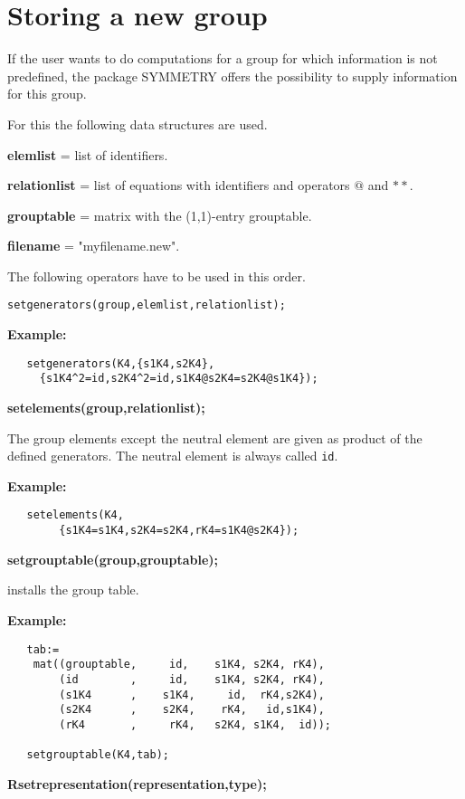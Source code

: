 \section{Storing a new group}

If the user wants to do computations for a group for which
information is not predefined,
the package SYMMETRY offers the possibility to supply information
for this group.

For this the following data structures are used.

{\bf elemlist} = list of identifiers.

{\bf relationlist}  = list of equations with identifiers and
operators $@$ and $**$.

{\bf grouptable} = matrix with the (1,1)-entry grouptable.

{\bf filename} = "myfilename.new".

\vspace{2cm}
The following operators have to be used in this order.

{\tt setgenerators(group,elemlist,relationlist);}

{\bf Example:}
\begin{verbatim}
   setgenerators(K4,{s1K4,s2K4},
     {s1K4^2=id,s2K4^2=id,s1K4@s2K4=s2K4@s1K4});
\end{verbatim}

{\bf setelements(group,relationlist);}

The group elements except the neutral element
are given as product of the defined
generators. The neutral element is always called {\tt id}.

{\bf Example:}
\begin{verbatim}
   setelements(K4,
        {s1K4=s1K4,s2K4=s2K4,rK4=s1K4@s2K4});
\end{verbatim}

{\bf setgrouptable(group,grouptable);}

installs the group table.

{\bf Example:}
\begin{verbatim}
   tab:=
    mat((grouptable,     id,    s1K4, s2K4, rK4),
        (id        ,     id,    s1K4, s2K4, rK4),
        (s1K4      ,    s1K4,     id,  rK4,s2K4),
        (s2K4      ,    s2K4,    rK4,   id,s1K4),
        (rK4       ,     rK4,   s2K4, s1K4,  id));

   setgrouptable(K4,tab);
\end{verbatim}

{\bf Rsetrepresentation(representation,type);}

